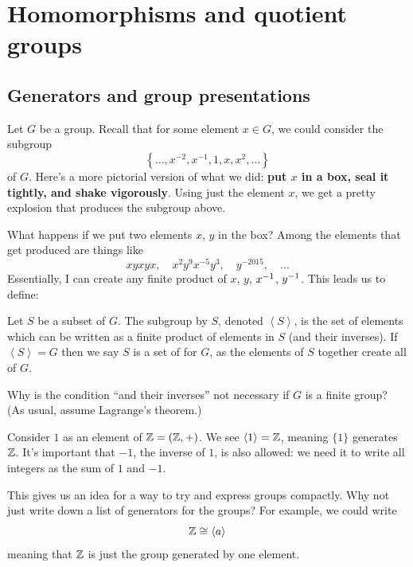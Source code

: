 \chapter{Homomorphisms and quotient groups}
\label{ch:homomorphisms_quotient}
\section{Generators and group presentations}

Let $G$ be a group.
Recall that for some element $x \in G$,
we could consider the subgroup
\[ \left\{ \dots, x^{-2}, x^{-1}, 1, x, x^2, \dots \right\} \]
of $G$.
Here's a more pictorial version of what we did:
\textbf{put $x$ in a box, seal it tightly, and shake vigorously}.
Using just the element $x$,
we get a pretty explosion that produces the subgroup above.

What happens if we put two elements $x$, $y$ in the box?
Among the elements that get produced are things like
\[ xyxyx, \quad x^2y^9x^{-5}y^3, \quad y^{-2015}, \quad \dots\]
Essentially, I can create any finite product of $x$, $y$, $x^{-1}$, $y^{-1}$.
This leads us to define:
\begin{definition}
	Let $S$ be a subset of $G$.
	The subgroup  by $S$,
	denoted $\left<S\right>$,
	is the set of elements which can be written as a
	finite product of elements in $S$ (and their inverses).
	If $\left<S\right> = G$ then we say $S$ is a set of
	 for $G$,
	as the elements of $S$ together create all of $G$.
\end{definition}
\begin{exercise}
	Why is the condition ``and their inverses''
	not necessary if $G$ is a finite group?
	(As usual, assume Lagrange's theorem.)
\end{exercise}

\begin{example}
	Consider $1$ as an element of $\mathbb Z = (\mathbb Z, +)$.
	We see $\left<1\right> = \mathbb Z$, meaning $\{1\}$ generates $\mathbb Z$.
	It's important that $-1$, the inverse of $1$, is also allowed:
	we need it to write all integers as the sum of $1$ and $-1$.
\end{example}

This gives us an idea for a way to try and express groups compactly.
Why not just write down a list of generators for the groups?
For example, we could write
\[ \mathbb Z \cong \left< a \right> \]
meaning that $\mathbb Z$ is just the group generated by one element.

